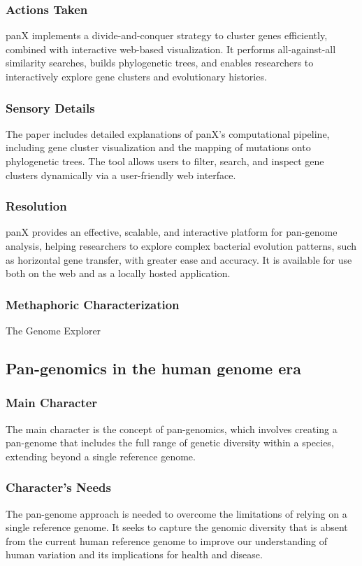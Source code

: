 \subsubsection{Actions Taken}
panX implements a divide-and-conquer strategy to cluster genes efficiently, combined with interactive web-based visualization. It performs all-against-all similarity searches, builds phylogenetic trees, and enables researchers to interactively explore gene clusters and evolutionary histories.

\subsubsection{Sensory Details}
The paper includes detailed explanations of panX's computational pipeline, including gene cluster visualization and the mapping of mutations onto phylogenetic trees. The tool allows users to filter, search, and inspect gene clusters dynamically via a user-friendly web interface.

\subsubsection{Resolution}
panX provides an effective, scalable, and interactive platform for pan-genome analysis, helping researchers to explore complex bacterial evolution patterns, such as horizontal gene transfer, with greater ease and accuracy. It is available for use both on the web and as a locally hosted application.


\subsubsection{Methaphoric Characterization}
The Genome Explorer


\subsection{Pan-genomics in the human genome era}
\subsubsection{Main Character}
The main character is the concept of pan-genomics, which involves creating a pan-genome that includes the full range of genetic diversity within a species, extending beyond a single reference genome.

\subsubsection{Character's Needs}
The pan-genome approach is needed to overcome the limitations of relying on a single reference genome. It seeks to capture the genomic diversity that is absent from the current human reference genome to improve our understanding of human variation and its implications for health and disease.

